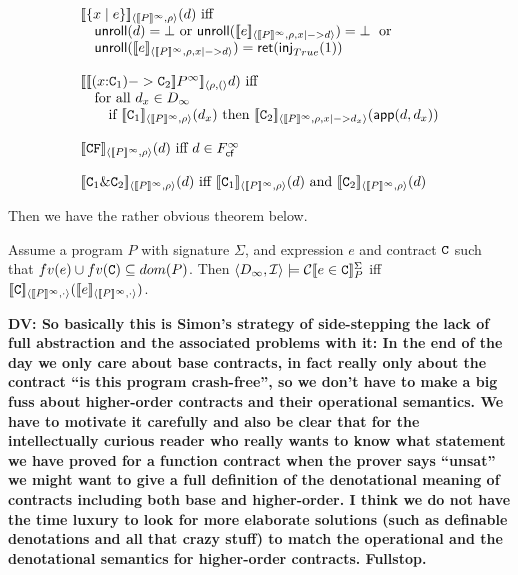 \documentclass[preprint,nocopyrightspace]{sigplanconf}
\begin{document}
\[\begin{array}{l}
    \interp{\{x \mid e\}}{\dbrace{P}^\infty}{\rho}(d) \text{ iff } \\
        \quad \unroll(d) = \bot \text{ or } 
        \unroll(\interp{e}{\dbrace{P}^\infty}{\rho,x|->d}) = \bot\;\text{ or } \\
        \quad \unroll(\interp{e}{\dbrace{P}^\infty}{\rho,x|->d}) = \ret(\inj{\mathop{True}}(1)) \\ \\
    \interp{\dbrace{(x{:}\Ct_1) -> \Ct_2}{P}^\infty}{\rho}(d) \text{ iff } \\
        \quad \text{for all } d_x \in D_\infty \\ 
        \quad\quad \text{if }
                     \interp{\Ct_1}{\dbrace{P}^\infty}{\rho}(d_x)\text{ then }
                     \interp{\Ct_2}{\dbrace{P}^\infty}{\rho,x|->d_x}(\dapp(d,d_x)) \\ \\ 
    \interp{\CF}{\dbrace{P}^\infty}{\rho}(d) \text{ iff }  d \in \Fcf^{\infty} \\  \\ 
    \interp{\Ct_1 \& \Ct_2}{\dbrace{P}^\infty}{\rho}(d) \text{ iff } 
       \interp{\Ct_1}{\dbrace{P}^\infty}{\rho}(d) \text{ and } 
       \interp{\Ct_2}{\dbrace{P}^\infty}{\rho}(d)
\end{array}\]

Then we have the rather obvious theorem below.

\begin{theorem}
Assume a program $P$ with signature $\Sigma$, and expression $e$ and contract $\Ct$ 
such that $fv(e) \cup fv(\Ct) \subseteq dom(P)$. Then 
$\langle D_\infty,{\cal I}\rangle \models \ctrans{\Sigma}{P}{e \in \Ct}$ iff
$\interp{\Ct}{\dbrace{P}^{\infty}}{\cdot}(\interp{e}{\dbrace{P}^\infty}{\cdot})$.
\end{theorem}


{\bf DV: So basically this is Simon's strategy of side-stepping the lack of full abstraction
and the associated problems with it: In the end of the day we only care about base contracts,
in fact really only about the contract ``is this program crash-free'', so we don't have to make
a big fuss about higher-order contracts and their operational semantics. We have to motivate it
carefully and also be clear that for the intellectually curious reader who really wants to know what statement we have proved for a function contract when the prover says ``unsat'' we might want to give a full definition of the denotational meaning of contracts including both base and higher-order. I think we do not have the time luxury to look for more elaborate solutions (such as definable denotations and all that crazy stuff) to match the operational and the denotational semantics for higher-order contracts. Fullstop.}
\end{document}
